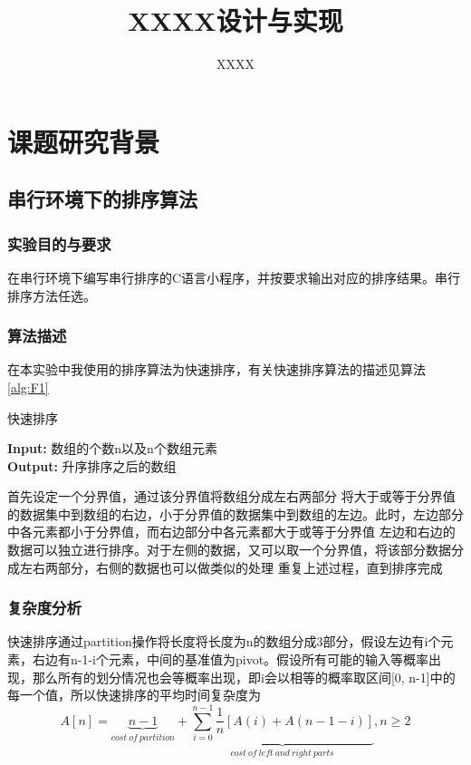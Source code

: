 \documentclass[supercite]{Experimental_Report}
\title{XXXX设计与实现}
\author{XXXX}
\theoremstyle{definition}
\begin{document}
\maketitle
\clearpage


\section{课题研究背景}
\subsection{串行环境下的排序算法}
\subsubsection{实验目的与要求}

在串行环境下编写串行排序的C语言小程序，并按要求输出对应的排序结果。串行排序方法任选。

\subsubsection{算法描述}
在本实验中我使用的排序算法为快速排序，有关快速排序算法的描述见算法\ref{alg:F1}
\begin{algorithm}[htb]
\caption{快速排序}
\label{alg:F1}
\hspace*{0.02in} {\bf Input:}
数组的个数n以及n个数组元素\\
\hspace*{0.02in} {\bf Output:} 
升序排序之后的数组
\begin{algorithmic}[1] 
\State 首先设定一个分界值，通过该分界值将数组分成左右两部分
\State 将大于或等于分界值的数据集中到数组的右边，小于分界值的数据集中到数组的左边。此时，左边部分中各元素都小于分界值，而右边部分中各元素都大于或等于分界值
\State 左边和右边的数据可以独立进行排序。对于左侧的数据，又可以取一个分界值，将该部分数据分成左右两部分，右侧的数据也可以做类似的处理
\State 重复上述过程，直到排序完成
\end{algorithmic}
\end{algorithm}

\subsubsection{复杂度分析}
快速排序通过partition操作将长度将长度为n的数组分成3部分，假设左边有i个元素，右边有n-1-i个元素，中间的基准值为pivot。假设所有可能的输入等概率出现，那么所有的划分情况也会等概率出现，即i会以相等的概率取区间[0, n-1]中的每一个值，所以快速排序的平均时间复杂度为
$$ A[n] = \underbrace{n-1}_{cost \ of \ partition}+\underbrace{\sum_{i = 0}^{n-1}\frac{1}{n}[A(i) + A(n-1-i)]}_{cost \ of \ left \ and \ right \ parts},n \ge 2 $$
\end{document}
